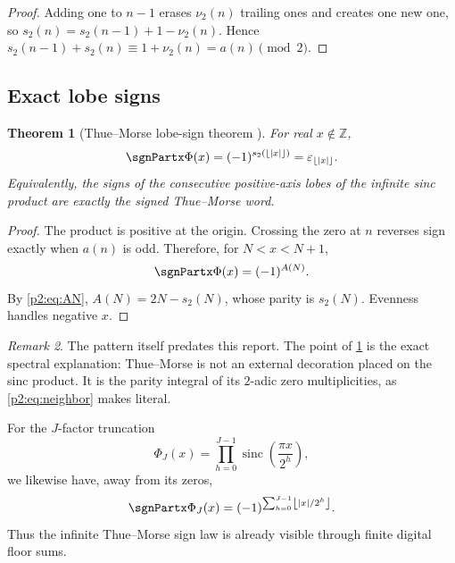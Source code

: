 \documentclass[11pt]{article}
\numberwithin{equation}{section}
\newtheorem{theorem}{Theorem}[section]
\theoremstyle{definition}
\theoremstyle{remark}
\newtheorem{remark}[theorem]{Remark}
\newcommand{\Z}{\mathbb Z}
\newcommand{\sinc}{\operatorname{sinc}}
\newcommand{\floor}[1]{\left\lfloor#1\right\rfloor}
\begin{document}
\begin{proof}
Adding one to $n-1$ erases $\nu_2(n)$ trailing ones and creates one new one, so
$s_2(n)=s_2(n-1)+1-\nu_2(n)$.  Hence
$s_2(n-1)+s_2(n)\equiv1+\nu_2(n)=a(n)\pmod2$.
\end{proof}

\subsection{Exact lobe signs}

\begin{theorem}[Thue--Morse lobe-sign theorem \Observed]
\label{p2:thm:lobe-sign}
For real $x\notin\Z$,
\begin{equation}
 \sgnPartx\Phi(x)=(-1)^{s_2(\floor{|x|})}
             =\varepsilon_{\floor{|x|}}.                  \label{p2:eq:lobe-sign}
\end{equation}
Equivalently, the signs of the consecutive positive-axis lobes of the infinite
sinc product are exactly the signed Thue--Morse word.
\end{theorem}

\begin{proof}
The product is positive at the origin.  Crossing the zero at $n$ reverses sign
exactly when $a(n)$ is odd.  Therefore, for $N<x<N+1$,
\[
 \sgnPartx\Phi(x)=(-1)^{A(N)}.
\]
By \eqref{p2:eq:AN}, $A(N)=2N-s_2(N)$, whose parity is $s_2(N)$.  Evenness handles
negative $x$.
\end{proof}

\begin{remark}
The pattern itself predates this report.  The point of
\cref{p2:thm:lobe-sign} is the exact spectral explanation: Thue--Morse is not an
external decoration placed on the sinc product.  It is the parity integral of
its $2$-adic zero multiplicities, as \eqref{p2:eq:neighbor} makes literal.
\end{remark}

For the $J$-factor truncation
\begin{equation}
 \Phi_J(x)=\prod_{h=0}^{J-1}\sinc\!\left(\frac{\pi x}{2^h}\right),             \label{p2:eq:PhiJ}
\end{equation}
we likewise have, away from its zeros,
\begin{equation}
 \sgnPartx\Phi_J(x)=(-1)^{\sum_{h=0}^{J-1}\floor{|x|/2^h}}.     \label{p2:eq:finite-sign}
\end{equation}
Thus the infinite Thue--Morse sign law is already visible through finite digital
floor sums.
\end{document}
